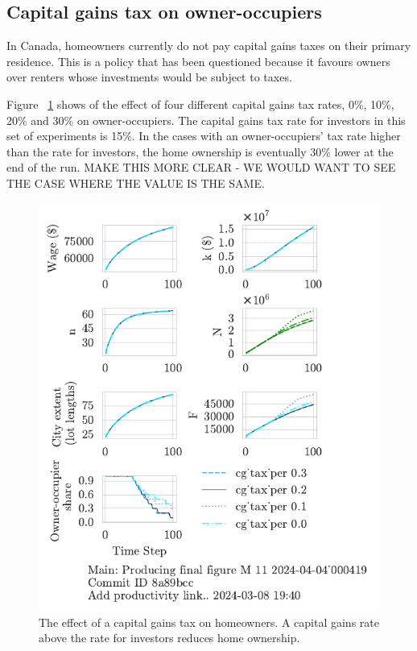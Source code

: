 \subsection{Capital gains tax on owner-occupiers}

In Canada, homeowners currently do not pay capital gains taxes on their primary residence. This is a policy that has been questioned because it favours owners over renters whose investments would be subject to taxes. 

Figure ~\ref{fig:CGpers_ownership_trajectory} shows of the effect of four different capital gains tax rates, 0\%, 10\%, 20\% and 30\% on owner-occupiers. The capital gains tax rate for investors in this set of experiments is 15\%. In  the cases with an owner-occupiers' tax rate higher than the rate for investors, %
the home ownership is eventually 30\% lower at the end of the run. {\color{red} MAKE THIS MORE CLEAR - WE WOULD WANT TO SEE THE CASE WHERE THE VALUE IS THE SAME. }

\begin{figure}[h!t]
    \centering
    \includegraphics[scale=1.0, trim={0 1.4cm 0 0},clip]{fig/cg_tax_per-000419.pdf}
    \caption{The effect of a capital gains tax on homeowners. A capital gains rate above the rate for investors reduces home ownership.}
    \label{fig:CGpers_ownership_trajectory}
\end{figure}

